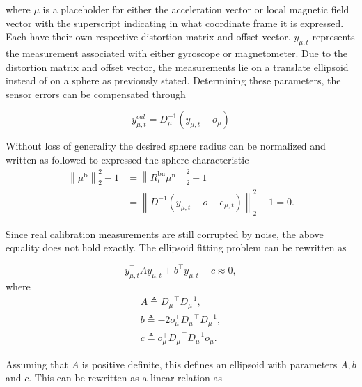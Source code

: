 where $\mu$ is a placeholder for either the acceleration vector or local magnetic field vector with the superscript indicating in what coordinate frame it is expressed. Each have their own respective distortion matrix and offset vector. $y_{\mu, t}$ represents the measurement associated with either gyroscope or magnetometer.
Due to the distortion matrix and offset vector, the measurements lie on a translate ellipsoid instead of on a sphere as previously stated. Determining these parameters, the sensor errors can be compensated through

\begin{equation}
	y_{\mu, t}^{cal}=D_\mu^{-1}\left(y_{\mu, t}-o_{\mu}\right)
\end{equation}

Without loss of generality the desired sphere radius can be normalized and written as followed to expressed the sphere characteristic
\begin{equation}
	\begin{aligned}
		\left\|\mu^{\mathrm{b}}\right\|_{2}^{2}-1 &=\left\|R_{t}^{\mathrm{bn}} \mu^{\mathrm{n}}\right\|_{2}^{2}-1 \\
		&=\left\|D^{-1}\left(y_{\mu, t}-o-e_{\mu, t}\right)\right\|_{2}^{2}-1=0.
	\end{aligned}
\end{equation}

Since real calibration measurements are still corrupted by noise, the above equality does not hold exactly. The ellipsoid fitting problem can be rewritten as

\begin{equation}
	\label{eq:calib_elipsoid}
	y_{\mu, t}^{\top} A y_{\mu, t}+b^{\top} y_{\mu, t}+c \approx 0,
\end{equation}
where
\begin{subequations}
	\label{eq:calib_elipsoid_components}
	\begin{align}
		A \triangleq D_\mu^{-\top} D_\mu^{-1}, \\
		b \triangleq-2 o_\mu^{\top} D_\mu^{-\top} D_\mu^{-1}, \\
		c \triangleq o_\mu^{\top} D_\mu^{-\top} D_\mu^{-1} o_\mu.
	\end{align}
\end{subequations}

Assuming that $A$ is positive definite, this defines an ellipsoid with parameters $A, b$ and $c$. This can be rewritten as a linear relation as

